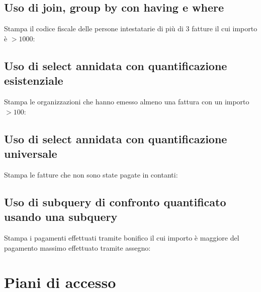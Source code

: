 \documentclass[a4paper,12pt]{article}
\begin{document}
 \subsection{ Uso di join, group by con having e where }

Stampa il codice fiscale delle persone intestatarie di più di 3 fatture il cui importo è $> 1000$:

\begin{minipage}{\textwidth}

\end{minipage}

 \subsection{ Uso di select annidata con quantificazione esistenziale }

Stampa le organizzazioni che hanno emesso almeno una fattura con un importo $> 100$:

\begin{minipage}{\textwidth}

\end{minipage}

 \subsection{ Uso di select annidata con quantificazione universale }

Stampa le fatture che non sono state pagate in contanti:

\begin{minipage}{\textwidth}

\end{minipage}

 \subsection{ Uso di subquery di confronto quantificato usando una subquery }

Stampa i pagamenti effettuati tramite bonifico il cui importo è maggiore del pagamento massimo effettuato tramite assegno:

\begin{minipage}{\textwidth}

\end{minipage}

 \section{ Piani di accesso }
\end{document}
